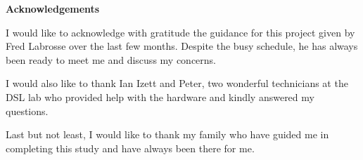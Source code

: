 \thispagestyle{empty}

\begin{center}
    {\LARGE\bf Acknowledgements}
\end{center}

I would like to acknowledge with gratitude the guidance for this project given by Fred Labrosse over the last few months. Despite the busy schedule, he has always been ready to meet me and discuss my concerns. 

I would also like to thank Ian Izett and Peter, two wonderful technicians at the DSL lab who provided help with the hardware and kindly answered my questions.

Last but not least, I would like to thank my family who have guided me in completing this study and have always been there for me.